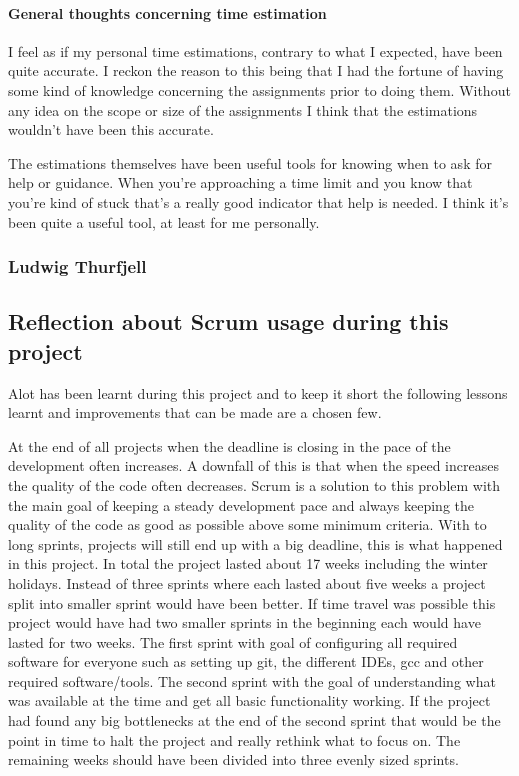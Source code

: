 \paragraph{General thoughts concerning time estimation}

I feel as if my personal time estimations, contrary to what I expected, have been quite accurate. I reckon the reason to this being that I had the fortune of having some kind of knowledge concerning the assignments prior to doing them. Without any idea on the scope or size of the assignments I think that the estimations wouldn't have been this accurate.

The estimations themselves have been useful tools for knowing when to ask for help or guidance. When you're approaching a time limit and you know that you're kind of stuck that's a really good indicator that help is needed. I think it's been quite a useful tool, at least for me personally.

\subsubsection{Ludwig Thurfjell}
\subsection{Reflection about Scrum usage during this project}
Alot has been learnt during this project and to keep it short the following lessons learnt and improvements that can be made are a chosen few.

At the end of all projects when the deadline is closing in the pace of the development often increases.
A downfall of this is that when the speed increases the quality of the code often decreases.
Scrum is a solution to this problem with the main goal of keeping a steady development pace and always keeping the quality of the code as good as possible above some minimum criteria.
With to long sprints, projects will still end up with a big deadline, this is what happened in this project.
In total the project lasted about 17 weeks including the winter holidays.
Instead of three sprints where each lasted about five weeks a project split into smaller sprint would have been better.
If time travel was possible this project would have had two smaller sprints in the beginning each would have lasted for two weeks.
The first sprint with goal of configuring all required software for everyone such as setting up git, the different IDEs, gcc and other required software/tools.
The second sprint with the goal of understanding what was available at the time and get all basic functionality working.
If the project had found any big bottlenecks at the end of the second sprint that would be the point in time to halt the project and really rethink what to focus on.
The remaining weeks should have been divided into three evenly sized sprints.

